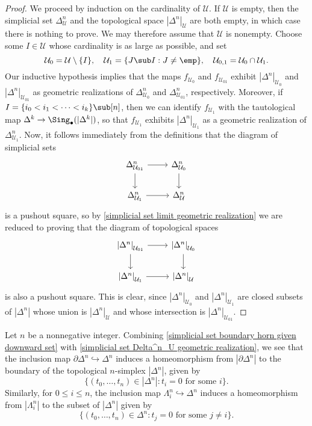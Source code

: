 \begin{proof}
We proceed by induction on the cardinality of $\mathcal{U}$. If $\mathcal{U}$ is empty, then the simplicial set $\Delta^n_\mathcal{U}$ and the topological space $|\Delta^n|_\mathcal{U}$ are both empty, in which case there is nothing to prove. We may therefore assume that $\mathcal{U}$ is nonempty. Choose some $I\in\mathcal{U}$ whose cardinality is as large as possible, and set
\[\mathcal{U}_0=\mathcal{U}\setminus\{I\},\quad \mathcal{U}_1=\{J\sub I:J\neq\emp\},\quad \mathcal{U}_{0,1}=\mathcal{U}_{0}\cap\mathcal{U}_1.\]
Our inductive hypothesis implies that the maps $f_{\mathcal{U}_0}$ and $f_{\mathcal{U}_{01}}$ exhibit $|\Delta^n|_{\mathcal{U}_0}$ and $|\Delta^n|_{\mathcal{U}_{01}}$ as geometric realizations of $\Delta^n_{\mathcal{U}_0}$ and $\Delta^n_{\mathcal{U}_{01}}$, respectively. Moreover, if $I=\{i_0<i_1<\cdots<i_k\}\sub[n]$, then we can identify $f_{\mathcal{U}_1}$ with the tautological map $\Delta^k\to\Sing_\bullet(|\Delta^k|)$, so that $f_{\mathcal{U}_1}$ exhibits $|\Delta^n|_{\mathcal{U}_1}$ as a geometric realization of $\Delta^n_{\mathcal{U}_1}$. Now, it follows immediately from the definitions that the diagram of simplicial sets
\[\begin{tikzcd}
\Delta^n_{\mathcal{U}_{01}}\ar[r]\ar[d]&\Delta^n_{\mathcal{U}_0}\ar[d]\\
\Delta^n_{\mathcal{U}_1}\ar[r]&\Delta^n_{\mathcal{U}}
\end{tikzcd}\]
is a pushout square, so by \cref{simplicial set limit geometric realization} we are reduced to proving that the diagram of topological spaces
\[\begin{tikzcd}
{|\Delta^n|}_{\mathcal{U}_{01}}\ar[r]\ar[d]&{|\Delta^n|}_{\mathcal{U}_0}\ar[d]\\
{|\Delta^n|}_{\mathcal{U}_1}\ar[r]&{|\Delta^n|}_{\mathcal{U}}
\end{tikzcd}\]
is also a pushout square. This is clear, since $|\Delta^n|_{\mathcal{U}_0}$ and $|\Delta^n|_{\mathcal{U}_1}$ are closed subsets of $|\Delta^n|$ whose union is $|\Delta^n|_{\mathcal{U}}$ and whose intersection is $|\Delta^n|_{\mathcal{U}_{01}}$.
\end{proof}
\begin{example}\label{simplicial set boundary horn geometric realization}
Let $n$ be a nonnegative integer. Combining \cref{simplicial set boundary horn given downward set} with \cref{simplicial set Delta^n_U geometric realization}, we see that the inclusion map $\partial\Delta^n\hookrightarrow\Delta^n$ induces a homeomorphism from $|\partial\Delta^n|$ to the boundary of the topological $n$-simplex $|\Delta^n|$, given by
\[\{(t_0,\dots,t_n)\in|\Delta^n|:\text{$t_i=0$ for some $i$}\}.\]
Similarly, for $0\leq i\leq n$, the inclusion map $\Lambda^n_i\hookrightarrow\Delta^n$ induces a homeomorphism from $|\Lambda^n_i|$ to the subset of $|\Delta^n|$ given by
\[\{(t_0,\dots,t_n)\in\Delta^n:\text{$t_j=0$ for some $j\neq i$}\}.\]
\end{example}
